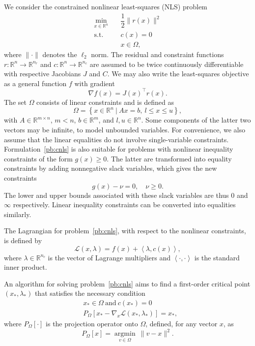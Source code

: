 \documentclass{article}
\numberwithin{equation}{section}
\newcommand{\RR}{{\mathbb{R}}} %
\newcommand{\calL}{{\mathcal{L}}}
\providecommand{\argmin}{\operatorname*{argmin}}
\newcommand{\inner}[2]{\left\langle {#1} , {#2} \right\rangle} %
\newcommand{\proj}[2]{P_{#1} \left[ {#2} \right]} %
\theoremstyle{plain}
\begin{document}
We consider the constrained nonlinear least-squares (NLS) problem
\begin{equation}
	\label{pb:cnls}
	\begin{aligned}
		\min_{x\in \RR^n} \quad & \dfrac{1}{2} \|r(x)\|^2 \\
		\text{s.t.} \quad & c(x) = 0 \\
		& x \in \Omega,
	\end{aligned}
\end{equation}
where $\|\cdot\|$ denotes the $\ell_2$ norm. The residual and constraint functions $r\colon \RR^n \to \RR^{n_r}$ and $c\colon \RR^n \to \RR^{n_c}$ are assumed to be twice continuously differentiable with respective Jacobians $J$ and $C$. We may also write the least-squares objective as a general function $f$ with gradient 
\[\nabla f(x) = J(x)^\top r(x).\] 
The set $\Omega$ consists of linear constraints and is defined as
\begin{equation}\label{eq:linear_constraints}
	\Omega = \left\{ x \in \RR^n \ | \ Ax=b,\ l \le x \le u\right\},
\end{equation}
with $A\in\RR^{m\times n}$, $m < n$, $b\in \RR^m$, and $l,u \in \RR^n$. Some components of the latter two vectors may be infinite, to model unbounded variables. For convenience, we also assume that the linear equalities do not involve single-variable constraints. Formulation~\eqref{pb:cnls} is also suitable for problems with nonlinear inequality constraints of the form $g(x) \ge 0$. The latter are transformed into equality constraints by adding nonnegative slack variables, which gives the new constraints
\begin{equation*}
	g(x) - \nu = 0,\quad \nu \ge 0.
\end{equation*}
The lower and upper bounds associated with these slack variables are thus $0$ and $\infty$ respectively. Linear inequality constraints can be converted into equalities similarly.

	The Lagrangian for problem~\eqref{pb:cnls}, with respect to the nonlinear constraints, is defined by 
	\begin{equation*}
		\calL(x,\lambda) = f(x) + \inner{\lambda}{c(x)},
	\end{equation*}
	where $\lambda \in \RR^{n_c}$ is the vector of Lagrange multipliers and $\inner{\cdot}{\cdot}$ is the standard inner product.

	An algorithm for solving problem~\eqref{pb:cnls} aims to find a first-order critical point $(x_*,\lambda_*)$ that satisfies the necessary condition
	\begin{equation*}
		\begin{aligned}
			&x_* \in \Omega\ \text{and}\ c(x_*)=0 \\
			&\proj{\Omega}{x_*-\nabla_x \calL(x_*,\lambda_*)}=x_*,
		\end{aligned}
	\end{equation*}
	where $\proj{\Omega}{\cdot}$ is the projection operator onto $\Omega$, defined, for any vector $x$, as
	\begin{equation*}
		\proj{\Omega}{x}= \argmin_{v\in \Omega} \ \|v-x\|^2. 
	\end{equation*}
\end{document}
